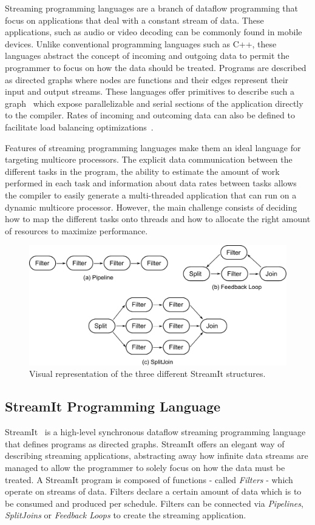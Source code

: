 Streaming programming languages are a branch of dataflow programming that focus on applications that deal with a constant stream of data.
These applications, such as audio or video decoding can be commonly found in mobile devices.
Unlike conventional programming languages such as C++, these languages abstract the concept of incoming and outgoing data to permit the programmer to focus on how the data should be treated.
Programs are described as directed graphs where nodes are functions and their edges represent their input and output streams. 
These languages offer primitives to describe such a graph~\cite{theis2002streamit} which expose parallelizable and serial sections of the application directly to the compiler. 
Rates of incoming and outcoming data can also be defined to facilitate load balancing optimizations~\cite{chen2005rawstream}.

Features of streaming programming languages make them an ideal language for targeting multicore processors.
The explicit data communication between the different tasks in the program, the ability to estimate the amount of work performed in each task and information about data rates between tasks allows the compiler to easily generate a multi-threaded application that can run on a dynamic multicore processor.
However, the main challenge consists of deciding how to map the different tasks onto threads and how to allocate the right amount of resources to maximize performance.


\begin{figure}
    \centering
    \includegraphics[width=1\textwidth]{streamit-paper/graphics/streamit_types.pdf}
    \caption{Visual representation of the three different StreamIt structures.}
    \label{fig:streamittypes}
\end{figure}

\subsection{StreamIt Programming Language}
StreamIt~\cite{theis2002streamit} is a high-level synchronous dataflow streaming programming language that defines programs as directed graphs.
StreamIt offers an elegant way of describing streaming applications, abstracting away how infinite data streams are managed to allow the programmer to solely focus on how the data must be treated.
A StreamIt program is composed of functions - called \textit{Filters} - which operate on streams of data.
Filters declare a certain amount of data which is to be consumed and produced per schedule.
Filters can be connected via \textit{Pipelines}, \textit{SplitJoins} or \textit{Feedback Loops} to create the streaming application.

